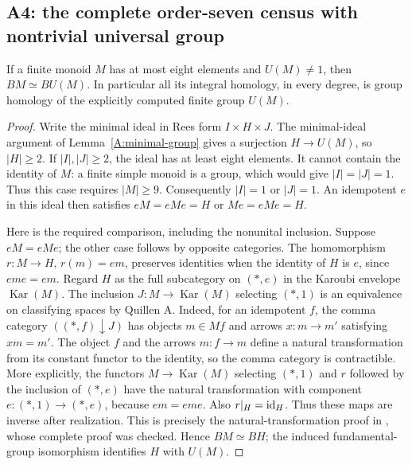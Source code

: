 \subsection{A4: the complete order-seven census with nontrivial universal group}\label{sec:A-census}
\begin{proposition}\label{prop:A-small-group-core}
If a finite monoid $M$ has at most eight elements and $U(M)\ne1$, then
$BM\simeq BU(M)$. In particular all its integral homology, in every degree,
is group homology of the explicitly computed finite group $U(M)$.
\end{proposition}
\begin{proof}
Write the minimal ideal in Rees form $I\times H\times J$. The minimal-ideal
argument of Lemma~\ref{A:minimal-group} gives a surjection $H\to U(M)$,
so $|H|\ge2$. If $|I|,|J|\ge2$, the ideal has at least eight elements.
It cannot contain the identity of $M$: a finite simple monoid is a group,
which would give $|I|=|J|=1$. Thus this case requires $|M|\ge9$.
Consequently $|I|=1$ or $|J|=1$. An idempotent $e$ in this ideal then
satisfies $eM=eMe=H$ or $Me=eMe=H$.

Here is the required comparison, including the nonunital inclusion.
Suppose $eM=eMe$; the other case follows by opposite categories.
The homomorphism $r:M\to H$, $r(m)=em$, preserves identities when the
identity of $H$ is $e$, since $eme=em$. Regard $H$ as the full subcategory
on $(\ast,e)$ in the Karoubi envelope $\operatorname{Kar}(M)$.
The inclusion $J:M\to\operatorname{Kar}(M)$ selecting $(\ast,1)$
is an equivalence on classifying spaces by Quillen A. Indeed, for an
idempotent $f$, the comma category $((\ast,f)\mathbin{\downarrow}J)$
has objects $m\in Mf$ and arrows $x:m\to m' $ satisfying $xm=m'$.
The object $f$ and the arrows $m:f\to m$ define a natural transformation
from its constant functor to the identity, so the comma category is contractible. More explicitly, the functors
$M\to\operatorname{Kar}(M)$ selecting $(\ast,1)$ and $r$ followed by the
inclusion of $(\ast,e)$ have the natural transformation with component
$e:(\ast,1)\to(\ast,e)$, because $em=eme$. Also $r|_H=\mathrm {id}_H$.
Thus these maps are inverse after realization. This is precisely the
natural-transformation proof in \cite[Theorem 2.7 and Corollary 2.8]{sweeney2025},
whose complete proof was checked. Hence $BM\simeq BH$; the induced
fundamental-group isomorphism identifies $H$ with $U(M)$.
\end{proof}

